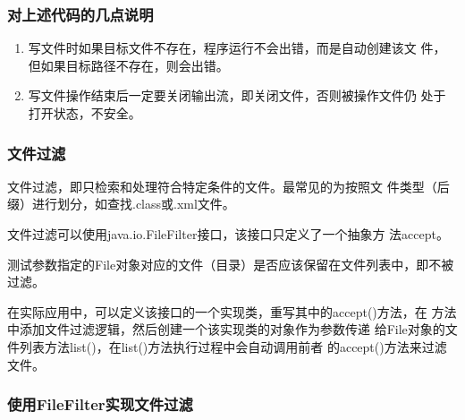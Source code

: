 \begin{frame}[fragile] %
  \frametitle{对上述代码的几点说明}

  \begin{enumerate}
  \item 写文件时如果目标文件不存在，程序运行不会出错，而是自动创建该文
    件，但如果目标路径不存在，则会出错。
  \item 写文件操作结束后一定要关闭输出流，即关闭文件，否则被操作文件仍
    处于打开状态，不安全。
  \end{enumerate}
\end{frame}

\begin{frame}[fragile] %
  \frametitle{文件过滤}

  \begin{block}{}
    文件过滤，即只检索和处理符合特定条件的文件。{\kai 最常见的为按照文
      件类型（后缀）进行划分，如查找.class或.xml文件。}

    文件过滤可以使用java.io.FileFilter接口，该接口只定义了一个抽象方
    法accept。
  \end{block}


  测试参数指定的File对象对应的文件（目录）是否应该保留在文件列表中，即不被过滤。

  {\kai 在实际应用中，可以定义该接口的一个实现类，重写其中的accept()方法，在
  方法中添加文件过滤逻辑，然后创建一个该实现类的对象作为参数传递
  给File对象的文件列表方法list()，在list()方法执行过程中会自动调用前者
  的accept()方法来过滤文件。}
  
\end{frame}

\begin{frame}[fragile] %
  \frametitle{使用FileFilter实现文件过滤}

  
\end{frame}


